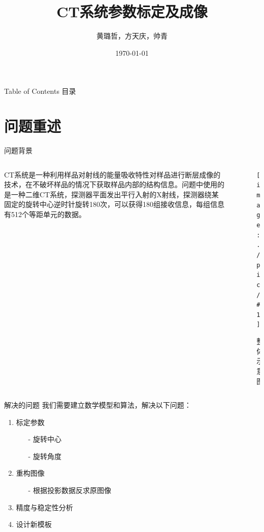 \documentclass{beamer} %
\newcommand{\maxpic}[2]{  \begin{figure}[H]
\centering
\texttt{[image: ./pic/\#1]}\\
\caption{#2}
\end{figure}}
\begin{document}
 

\title{CT系统参数标定及成像}
\author{黄璐哲，方天庆，帅青}
\date{\today}

\begin{frame}[plain,t]
	\titlepage
\end{frame} 

\begin{frame}{Table of Contents 目录}
	\tableofcontents
\end{frame} 

\section{问题重述}
\begin{frame}{问题背景}
	\begin{columns}[t] 
		\begin{column}[c]{5cm} 
			CT系统是一种利用样品对射线的能量吸收特性对样品进行断层成像的技术，在不破坏样品的情况下获取样品内部的结构信息。问题中使用的是一种二维CT系统，探测器平面发出平行入射的X射线，探测器绕某固定的旋转中心逆时针旋转180次，可以获得180组接收信息，每组信息有512个等距单元的数据。
		\end{column} 
		\begin{column}[c]{5cm} 
			\maxpic{Overall_Sketch.png}{整体示意图}
		\end{column} 
	\end{columns}
\end{frame} %


\begin{frame}{解决的问题}
	我们需要建立数学模型和算法，解决以下问题：
	\begin{enumerate}		  
		\item 标定参数
			\begin{enumerate}
				\item[-] 旋转中心
				\item[-] 旋转角度
			\end{enumerate}
		\item 重构图像
			\begin{enumerate}
				\item[-] 根据投影数据反求原图像
			\end{enumerate}
		\item 精度与稳定性分析
		\item 设计新模板
	\end{enumerate}
\end{frame} %
\end{document}

